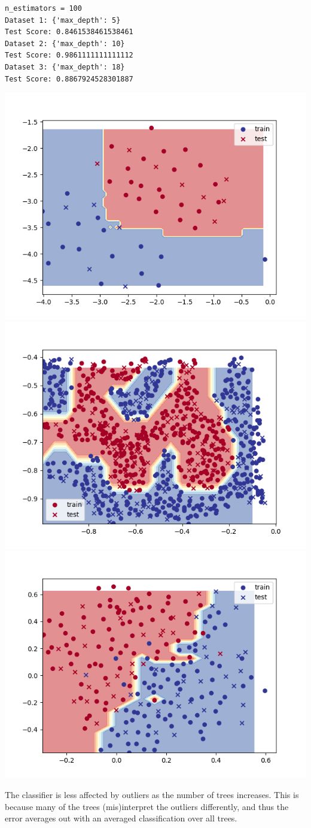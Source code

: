     \begin{verbatim}
n_estimators = 100
Dataset 1: {'max_depth': 5}
Test Score: 0.8461538461538461
Dataset 2: {'max_depth': 10}
Test Score: 0.9861111111111112
Dataset 3: {'max_depth': 18}
Test Score: 0.8867924528301887
    \end{verbatim}
    \includegraphics[width=\textwidth / 2]{plots/randomtree_nest100_1}
    \includegraphics[width=\textwidth / 2]{plots/randomtree_nest100_2}
    \includegraphics[width=\textwidth / 2]{plots/randomtree_nest100_3}

    The classifier is less affected by outliers as the number of trees increases.
    This is because many of the trees (mis)interpret the outliers differently, and thus the error averages out with an
    averaged classification over all trees.


